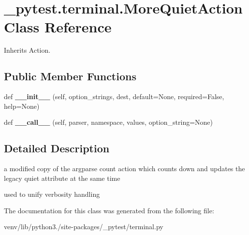 \hypertarget{class__pytest_1_1terminal_1_1_more_quiet_action}{}\section{\+\_\+pytest.\+terminal.\+More\+Quiet\+Action Class Reference}
\label{class__pytest_1_1terminal_1_1_more_quiet_action}


Inherits Action.

\subsection*{Public Member Functions}
\begin{DoxyCompactItemize}
\item 
\mbox{\label{class__pytest_1_1terminal_1_1_more_quiet_action_a93e42becba5373e75c608eb535f3f8a7}} 
def {\bfseries \+\_\+\+\_\+init\+\_\+\+\_\+} (self, option\+\_\+strings, dest, default=None, required=False, help=None)
\item 
\mbox{\label{class__pytest_1_1terminal_1_1_more_quiet_action_a4d70fa6f6229380c46e2ccf32aaf9650}} 
def {\bfseries \+\_\+\+\_\+call\+\_\+\+\_\+} (self, parser, namespace, values, option\+\_\+string=None)
\end{DoxyCompactItemize}


\subsection{Detailed Description}
\begin{DoxyVerb}a modified copy of the argparse count action which counts down and updates
the legacy quiet attribute at the same time

used to unify verbosity handling
\end{DoxyVerb}
 

The documentation for this class was generated from the following file\+:\begin{DoxyCompactItemize}
\item 
venv/lib/python3./site-\/packages/\+\_\+pytest/terminal.\+py\end{DoxyCompactItemize}

